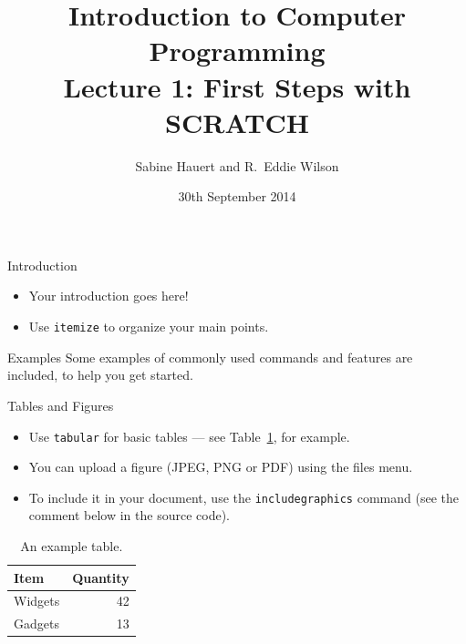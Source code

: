 \documentclass{beamer}
\title[First Steps with SCRATCH]{Introduction to Computer Programming\\ Lecture 1: First Steps with SCRATCH}
\author{Sabine Hauert and R.~Eddie Wilson}
\institute{Department of Engineering Mathematics}
\date{30th September 2014}
\begin{document}
\begin{frame}
  \titlepage
\end{frame}
\begin{frame}{Introduction}
\begin{itemize}
  \item Your introduction goes here!
  \item Use \texttt{itemize} to organize your main points.
\end{itemize}
\vskip 1cm
\begin{block}{Examples}
Some examples of commonly used commands and features are included, to help you get started.
\end{block}
\end{frame}


\begin{frame}{Tables and Figures}
\begin{itemize}
\item Use \texttt{tabular} for basic tables --- see Table~\ref{tab:widgets}, for example.
\item You can upload a figure (JPEG, PNG or PDF) using the files menu. 
\item To include it in your document, use the \texttt{includegraphics} command (see the comment below in the source code).
\end{itemize}


\begin{table}
\centering
\begin{tabular}{l|r}
Item & Quantity \\\hline
Widgets & 42 \\
Gadgets & 13
\end{tabular}
\caption{\label{tab:widgets}An example table.}
\end{table}
\end{frame}
\end{document}
